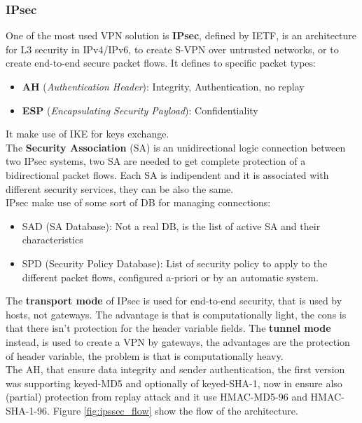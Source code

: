 \documentclass[12pt]{article}
\begin{document}
\subsubsection{IPsec}
One of the most used VPN solution is \textbf{IPsec}, defined by IETF, is an architecture for L3 security in IPv4/IPv6, to create S-VPN over untrusted networks, or to create end-to-end secure packet flows. It defines to specific packet types:
\begin{itemize}
  \item \textbf{AH} (\textit{Authentication Header}): Integrity, Authentication, no replay
  \item \textbf{ESP} (\textit{Encapsulating Security Payload}): Confidentiality
\end{itemize}
It make use of IKE for keys exchange.\\
The \textbf{Security Association} (SA) is an unidirectional logic connection between two IPsec systems, two SA are needed to get complete protection of a bidirectional packet flows. Each SA is indipendent and it is associated with different security services, they can be also the same.\\
IPsec make use of some sort of DB for managing connections:
\begin{itemize}
  \item SAD (SA Database): Not a real DB, is the list of active SA and their characteristics
  \item SPD (Security Policy Database): List of security policy to apply to the different packet flows, configured a-priori or by an automatic system.
\end{itemize}
The \textbf{transport mode} of IPsec is used for end-to-end security, that is used by hosts, not gateways. The advantage is that is computationally light, the cons is that there isn't protection for the header variable fields. The \textbf{tunnel mode} instead, is used to create a VPN by gateways, the advantages are the protection of header variable, the problem is that is computationally heavy.\\
The AH, that ensure data integrity and sender authentication, the first version was supporting keyed-MD5 and optionally of keyed-SHA-1, now in ensure also (partial) protection from replay attack and it use HMAC-MD5-96 and HMAC-SHA-1-96. Figure \ref{fig:ipssec_flow} show the flow of the architecture.
\end{document}
